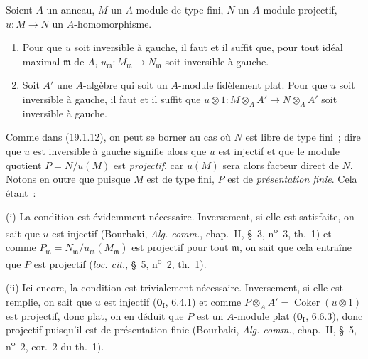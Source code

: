 \begin{proposition}[19.1.14]
\label{0.19.1.14-fr}
Soient $A$ un anneau, $M$ un $A$-module de type fini, $N$ un $A$-module
projectif, $u:M\to N$ un $A$-homomorphisme.
\begin{enumerate}
  \item[(i)] Pour que $u$ soit inversible à gauche, il faut et il suffit que,
  pour tout idéal maximal $\mathfrak m$ de $A$,
  $u_{\mathfrak m}:M_{\mathfrak m}\to N_{\mathfrak m}$ soit inversible à
  gauche.
  \item[(ii)] Soit $A'$ une $A$-algèbre qui soit un $A$-module fidèlement
  plat. Pour que $u$ soit inversible à gauche, il faut et il suffit que
  $u\otimes1:M\otimes_AA'\to N\otimes_AA'$ soit inversible à gauche.
\end{enumerate}
\end{proposition}

Comme dans (19.1.12), on peut se borner au cas où $N$ est libre de type fini~;
dire que $u$ est inversible à gauche signifie alors que $u$ est injectif et
que le module quotient $P=N/u(M)$ est \emph{projectif}, car $u(M)$ sera alors
facteur direct de $N$. Notons en outre que puisque $M$ est de type fini, $P$
est de \emph{présentation finie}. Cela étant~:

(i) La condition est évidemment nécessaire. Inversement, si elle est
satisfaite, on sait que $u$ est injectif (Bourbaki, \emph{Alg. comm.},
chap.~II, §~3, n\textsuperscript{o}~3, th.~1) et comme
$P_{\mathfrak m}=N_{\mathfrak m}/u_{\mathfrak m}(M_{\mathfrak m})$ est
projectif pour tout $\mathfrak m$, on sait que cela entraîne que $P$ est
projectif (\emph{loc. cit.}, §~5, n\textsuperscript{o}~2, th.~1).

(ii) Ici encore, la condition est trivialement nécessaire. Inversement, si
elle est remplie, on sait que $u$ est injectif ($\mathbf{0}_{\mathrm I}$,
6.4.1) et comme $P\otimes_AA'=\operatorname{Coker}(u\otimes1)$ est projectif,
donc plat, on en déduit que $P$ est un $A$-module plat
($\mathbf{0}_{\mathrm I}$, 6.6.3), donc projectif puisqu'il est de présentation
finie (Bourbaki, \emph{Alg. comm.}, chap.~II, §~5,
n\textsuperscript{o}~2, cor.~2 du th.~1).


